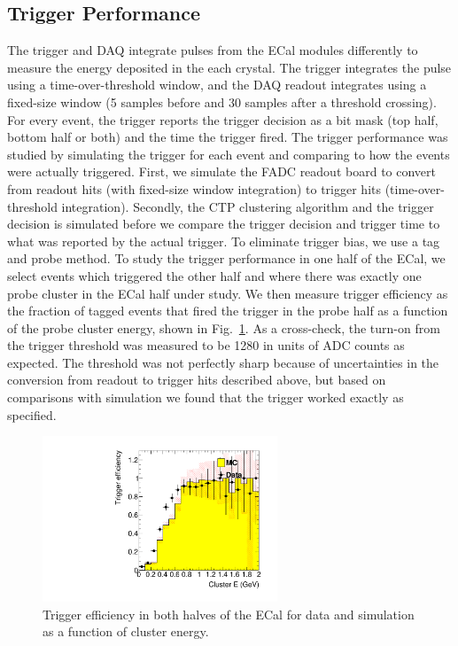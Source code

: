\documentclass[final,3p,times,twocolumn]{elsarticle}
\begin{document}
\subsection{Trigger Performance}
The trigger and DAQ integrate pulses from the ECal modules differently to measure the energy 
deposited in the each crystal. The trigger integrates the pulse using a time-over-threshold window, and 
the DAQ readout integrates using a fixed-size window (5 samples before and 30 samples after a 
threshold crossing). For every event, the trigger reports the trigger decision as a bit mask (top half, 
bottom half or both) and the time the trigger fired. The trigger performance was studied by simulating the 
trigger for each event and comparing to how the events were actually triggered.
First, we simulate the FADC readout board to convert from readout hits (with fixed-size window 
integration) to trigger hits (time-over-threshold integration). Secondly, the CTP clustering 
algorithm and the trigger decision is simulated before we compare the trigger decision and trigger time 
to what was reported by the actual trigger. To eliminate trigger bias, we use a tag and probe method. To 
study the trigger performance in one half of the ECal, we select events which triggered the other half 
and where there was exactly one probe cluster in the ECal half under study. We then measure trigger 
efficiency as the fraction of tagged events that fired the trigger in the probe half as a function of the 
probe cluster energy, shown in Fig.~\ref{fig:turnon}. As a cross-check, the turn-on from the trigger 
threshold was measured to be 1280 in units of ADC counts as expected. The threshold was not 
perfectly sharp because of uncertainties in the conversion from readout to trigger hits described 
above, but based on comparisons with simulation we found that the trigger worked exactly as 
specified.
\begin{figure}[ht]
\begin{center}
{\small
	\includegraphics[width=7cm]{figures/h_cl_E_probedata_eff_h_cl_E_probeMC_eff_dataMC_1351-v7-trig-tagBot.pdf}
	\caption{Trigger efficiency in both halves of the ECal for data and simulation as a 
	function of cluster energy.}
\label{fig:turnon}
}
\end{center}
\end{figure}
\end{document}
